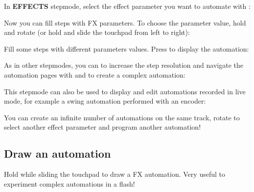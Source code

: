 In \textbf{EFFECTS} stepmode, select the effect parameter you want to automate with \encodericon{}:



Now you can fill steps with FX parameters. To choose the parameter value, hold  and rotate \encodericon{} (or hold  and slide the touchpad from left to right):



Fill some steps with different parameters values. Press  to display the automation:




As in other stepmodes, you can  to increase the step resolution and navigate the automation pages with \btn{<} and \btn{>} to create a complex automation:



This stepmode can also be used to display and edit automations recorded in live mode, for example a swing automation performed with an encoder:


You can create an infinite number of automations on the same track, rotate \encodericon{} to select another effect parameter and program another automation!

\subsection{Draw an automation}

Hold  while sliding the touchpad to draw a FX automation. Very useful to experiment complex automations in a flash!

